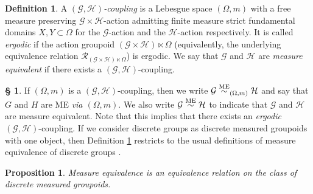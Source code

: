 \documentclass[11pt, oneside]{amsart}
\newtheorem{prop}[lemma]{Proposition}
\theoremstyle{definition}
\newtheorem{defn}[lemma]{Definition}
\newtheorem{no}[lemma]{\S}
\theoremstyle{remark}
\theoremstyle{TheoremNum}
\newcommand{\cG}{\mathcal{G}}
\newcommand{\cH}{\mathcal{H}}
\newcommand{\ME}{\overset{\textup{ME}}{\sim}}
\begin{document}
\begin{defn}\label{DefCoupling}
A \emph{$(\mathcal{G},\mathcal{H})$-coupling} is a Lebesgue space $(\Omega,m)$ with a free measure preserving $\mathcal{G}\times\mathcal{H}$-action admitting finite measure strict fundamental domains $X,Y\subset \Omega$ for the $\mathcal{G}$-action and the $\mathcal{H}$-action respectively. It is called \emph{ergodic} if the action groupoid $(\mathcal{G} \times \mathcal{H})\ltimes \Omega$ (equivalently, the underlying equivalence relation $\mathcal{R}_{(\mathcal{G} \times \mathcal{H})\ltimes \Omega}$) is ergodic. We say that $\cG$ and $\cH$ are \emph{measure equivalent} if there exists a $(\cG, \cH)$-coupling.
\end{defn}
\begin{no} If $(\Omega, m)$ is a $(\cG, \cH)$-coupling, then we write 
$\mathcal{G}\overset{\textup{ME}}{\sim}_{(\Omega, m)} \mathcal{H}$
and say that $G$ and $H$ are ME \emph{via $(\Omega, m)$}. We also write $\mathcal{G}\ME \mathcal{H}$ to indicate that $\cG$ and $\cH$ are measure equivalent. Note that this implies that there exists an \emph{ergodic} $(\cG, \cH)$-coupling. If we consider discrete groups as discrete measured groupoids with one object, then Definition \ref{DefCoupling} restricts to the usual definitions of measure equivalence of discrete groups \cite{furman:survey}.
\end{no}
\begin{prop}\label{OME} Measure equivalence is an equivalence relation on the class of discrete measured groupoids.
\end{prop}
\end{document}
